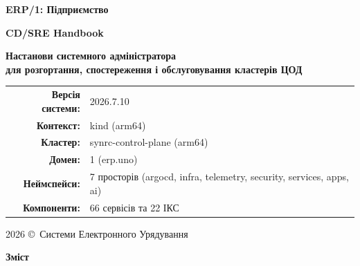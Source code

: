 \documentclass[12pt,a4paper]{article}
\newcommand\HUGE[1]{\fontsize{38}{38}\selectfont #1}
\begin{document}
\pagestyle{fancy}

\begin{titlepage}
\AddToShipoutPictureBG*{\AtPageLowerLeft{\color{primary}\rule{\paperwidth}{\paperheight}}}
\color{white}\thispagestyle{empty}\vspace*{3cm}\centering
  {\Huge \textbf{ERP/1: Підприємство} \par}\vspace{1.5cm}
  {\HUGE \textbf{CD/SRE Handbook} \par}\vspace{2cm}
  {\LARGE \textbf{Настанови системного адміністратора\\ для розгортання, спостереження і обслуговування кластерів ЦОД} \par}
  \vspace{1.5cm}
  \begin{tabular}{rl}
    \textbf{Версія системи:}  & 2026.7.10 \\[4pt]
    \textbf{Контекст:}        & kind (arm64) \\[4pt]
    \textbf{Кластер:}         & synrc-control-plane (arm64) \\[4pt]
    \textbf{Домен:}           & 1 (erp.uno)\\[4pt]
    \textbf{Неймспейси:}      & 7 просторів (argocd, infra, telemetry, security, services, apps, ai) \\[4pt]
    \textbf{Компоненти:}      & 66 сервісів та 22 ІКС \\[4pt]
  \end{tabular}
\vfill
  {\large 2026 \copyright\ Системи Електронного Урядування \par}
\end{titlepage}

\newpage
\begin{center}{\Huge\color{primary}\bfseries Зміст\par}\end{center}
\vspace{30pt}
\tableofcontents

\newpage
\begin{abstract}
\noindent
Цей \textbf{CD/SRE Handbook} є офіційним технічним довідником з Continuous Deployment та Site Reliability Engineering
для платформи \textbf{ERP/1: Підприємство} компанії "Критпографічні Телесистеми". Він охоплює повну архітектуру
всіх просторів Kubernetes кластеру, деталізовану структуру Helm чартів,
специфікацію всіх маніфестів компонентів, а також практики SRE: SLI/SLO, бюджети на помилки, чергування і операційні вікна,
інженерія хаосу і GitOps/ArgoCD. Документ адаптує класичні принципи Site Reliability Engineering (Google SRE Book) до реалій державних
ERP систем із вимогами КСЗІ, мультитенантності та неперервного впровадження.
\end{abstract}
\end{document}

